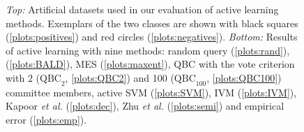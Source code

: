 \begin{figure}
	\caption[Evaluation of Bayesian active learning on artificial datasets]{\emph{Top:} Artificial datasets used in our evaluation of active learning methods. Exemplars of the two classes are shown with black squares (\ref{plots:positives}) and red circles (\ref{plots:negatives}). \emph{Bottom:} Results of active learning with nine methods: random query (\ref{plots:rand}), \ourmethod (\ref{plots:BALD}),  MES (\ref{plots:maxent}), QBC with the vote criterion with 2 ($\mbox{QBC}_2$, \ref{plots:QBC2}) and 100 ($\mbox{QBC}_{100}$, \ref{plots:QBC100}) committee members, active SVM (\ref{plots:SVM}), IVM (\ref{plots:IVM}), Kapoor \emph{et al.} \citep{Kapoor2007} (\ref{plots:dec}), Zhu \emph{et al.} \citep{Zhu2003} (\ref{plots:semi}) and empirical error (\ref{plots:emp}).}
	\label{fig:artificial}
\end{figure}

